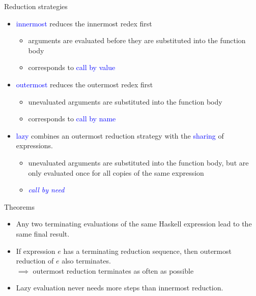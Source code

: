 \documentclass{beamer}
\begin{document}
\begin{frame}{Reduction strategies}

\begin{itemize}
    \item \textcolor{blue}{innermost} reduces the innermost redex first\pause
        \begin{itemize}
            \item arguments are evaluated before they are substituted into the function body\pause
            \item corresponds to \textcolor{blue}{call by value}
        \end{itemize}\pause
    \item \textcolor{blue}{outermost} reduces the outermost redex first\pause
        \begin{itemize}
            \item unevaluated arguments are substituted into the function body\pause
            \item corresponds to \textcolor{blue}{call by name}
        \end{itemize}\pause
    \item \textcolor{blue}{lazy} combines an outermost reduction strategy with the \textcolor{blue}{sharing} of expressions.\pause
        \begin{itemize}
            \item unevaluated arguments are substituted into the function body, but are only evaluated once for all copies of the same expression\pause
            \item \textit{\textcolor{blue}{call by need}}
        \end{itemize}
\end{itemize}

\end{frame}

\begin{frame}{Theorems}

\begin{itemize}
    \item Any two terminating evaluations of the same Haskell expression lead to the same final result.\pause
    \item If expression $e$ has a terminating reduction sequence, then outermost reduction of $e$ also terminates. \\ \pause
        $\implies$ outermost reduction terminates as often as possible\pause
    \item Lazy evaluation never needs more steps than innermost reduction.
\end{itemize}

\end{frame}
\end{document}
